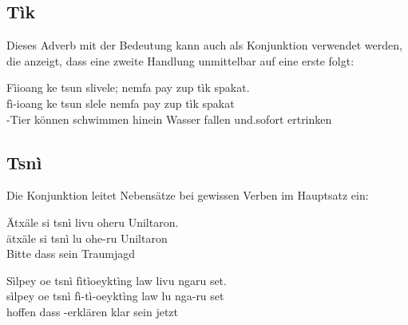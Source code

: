 \subsection{Tìk}  \label{syn:tìk}
Dieses Adverb mit der Bedeutung  kann auch als Konjunktion verwendet werden, die anzeigt, dass eine zweite Handlung unmittelbar auf eine erste folgt:

\begin{interlin}
	\glll \Npawl{}Fìioang ke tsun slivele; nemfa pay zup tìk spakat. \\
	fì-ioang ke tsun slele nemfa pay zup tìk spakat \\
	-Tier  können schwimmen hinein Wasser fallen und.sofort ertrinken \\
\end{interlin}

\subsection{Tsnì} \label{syn:tsni}
Die Konjunktion   leitet Nebensätze bei gewissen Verben im Hauptsatz ein:

\begin{interlin}
	\glll \Npawl{}Ätxäle si tsnì livu oheru Uniltaron. \\
	ätxäle si tsnì lu ohe-ru Uniltaron \\
	Bitte  dass sein  Traumjagd \\
\end{interlin}

\begin{interlin}
	\glll \Npawl{}Sìlpey oe tsnì fìtìoeyktìng law livu ngaru set. \\
	sìlpey oe tsnì fì-tì-oeyktìng law lu nga-ru set \\
	hoffen  dass -erklären klar sein  jetzt \\
\end{interlin}

